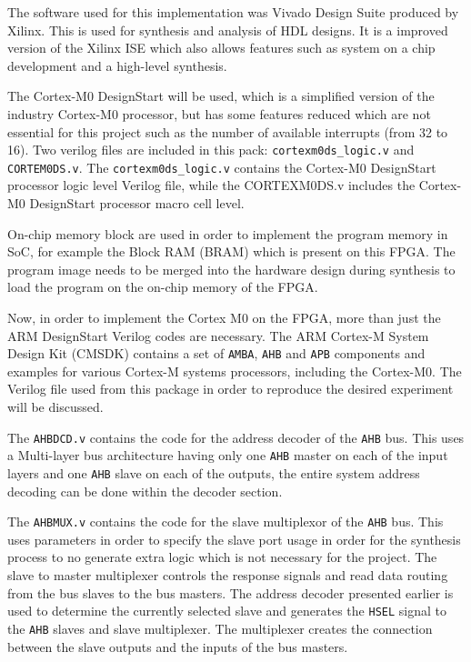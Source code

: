 The software used for this implementation was Vivado Design Suite produced by Xilinx. This is used for synthesis and analysis of HDL designs. It is a improved version of the Xilinx ISE which also allows features such as system on a chip development and a high-level synthesis. 

The Cortex-M0 DesignStart will be used, which is a simplified version of the industry Cortex-M0 processor, but has some features reduced which are not essential for this project such as the number of available interrupts (from 32 to 16). Two verilog files are included in this pack:  \verb|cortexm0ds_logic.v| and \verb|CORTEM0DS.v|. The \verb|cortexm0ds_logic.v| contains the Cortex-M0 DesignStart processor logic level Verilog file, while the CORTEXM0DS.v includes the Cortex-M0 DesignStart processor macro cell level.

On-chip memory block are used in order to implement the program memory in SoC, for example the Block RAM (BRAM) which is present on this FPGA. The program image needs to be merged into the hardware design during synthesis to load the program on the on-chip memory of the FPGA.

Now, in order to implement the Cortex M0 on the FPGA, more than just the ARM DesignStart Verilog codes are necessary. The ARM Cortex-M System Design Kit (CMSDK) contains a set of \verb|AMBA|, \verb|AHB| and \verb|APB| components and examples for various Cortex-M systems processors, including the Cortex-M0. The  Verilog file  used from this package in order to reproduce the desired experiment will be discussed.

The \verb|AHBDCD.v| contains the code for the address decoder of the \verb|AHB| bus. This uses a Multi-layer bus architecture having only one \verb|AHB| master on each of the input layers and one \verb|AHB| slave on each of the outputs, the entire system address decoding can be done within the decoder section. 

The \verb|AHBMUX.v| contains the code for the slave multiplexor of the \verb|AHB| bus. This uses parameters in order to specify the slave port usage in order for the synthesis process to no generate extra logic which is not necessary for the project. The slave to master multiplexer controls the response signals and read data routing from the bus slaves to the bus masters. The address decoder presented earlier is used to determine the currently selected slave and generates the \verb|HSEL| signal to the \verb|AHB| slaves and slave multiplexer. The multiplexer creates the connection between the slave outputs and the inputs of the bus masters. 

